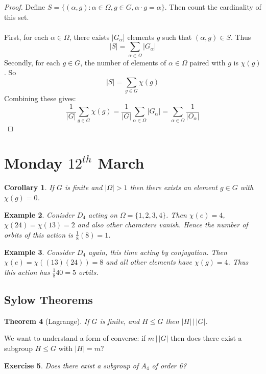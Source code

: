 \documentclass[a4paper,10pt]{article}
\newtheorem{thm}{Theorem}
\newtheorem{Cor}[thm]{Corollary}
\newtheorem{eg}[thm]{Example}
\newtheorem{Ex}[thm]{Exercise}
\begin{document}
\begin{proof}
Define $S = \{ (\alpha, g) : \alpha \in \Omega, g \in G, \alpha \cdot g = \alpha \}$. Then count the cardinality of this set. \\
\\
First, for each $\alpha \in \Omega$, there exists $|G_\alpha$| elements $g$ such that $(\alpha, g) \in S$. Thus
\[ |S| = \sum_{\alpha \in \Omega} |G_\alpha| \]
Secondly, for each $g \in G$, the number of elements of $\alpha \in \Omega$ paired with $g$ is $\chi(g)$. So
\[ |S| = \sum_{g \in G} \chi(g) \]
Combining these gives:
\[ \frac{1}{|G|} \sum_{g \in G} \chi(g) = \frac{1}{|G|} \sum_{\alpha \in \Omega} |G_\alpha| = \sum_{\alpha \in \Omega} \frac{1}{|O_\alpha|} \]
\end{proof}

\newpage
\section{Monday $12^{th}$ March}
\begin{Cor}
If $G$ is finite and $|\Omega| >1$ then there exists an element $g \in G$ with $\chi(g) = 0$.  
\end{Cor}

\begin{eg}
Conisder $D_4$ acting on $\Omega = \{ 1,2,3,4 \}$. Then $\chi(e) = 4$, $\chi(24) = \chi(13) = 2$ and also other characters vanish. Hence the number of orbits of this action is $\frac{1}{8} (8) = 1$. 
\end{eg}

\begin{eg}
Consider $D_4$ again, this time acting by conjugation. Then $\chi(e) = \chi((13)(24)) = 8$ and all other elements have $\chi(g) = 4$. Thus this action has $\frac{1}{8} 40 = 5$ orbits. 
\end{eg}

\subsection{Sylow Theorems}
\begin{thm}[Lagrange]
If $G$ is finite, and $H \leq G$ then $|H| \, \big| \, |G|$.
\end{thm}
We want to understand a form of converse: if $m \, \big| \, |G|$ then does there exist a subgroup $H \leq G$ with $|H| = m$?

\begin{Ex}
Does there exist a subgroup of $A_4$ of order 6?
\end{Ex}
\end{document}

